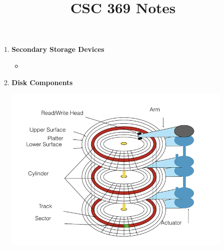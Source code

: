 \documentclass[12pt]{article}
\begin{document}
\title{CSC 369 Notes}

\begin{enumerate}[1.]
    \item \textbf{Secondary Storage Devices}

    \begin{itemize}
        \item
    \end{itemize}
    \item \textbf{Disk Components}

    \begin{center}
    \includegraphics[width=0.8\linewidth]{images/notes_1.png}
    \end{center}


\end{enumerate}
\end{document}

